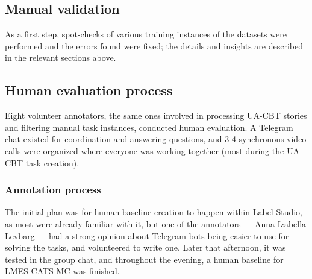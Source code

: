 \subsection{Manual validation}\label{manual-validation}
As a first step, spot-checks of various training instances of the
datasets were performed and the errors found were fixed; the details and insights are described in the relevant sections above.






\subsection{Human evaluation process}
Eight volunteer annotators, the same ones involved in processing UA-CBT stories and filtering manual task instances, conducted human evaluation.
A Telegram chat existed for coordination and answering questions, and 3-4 synchronous video calls were organized where everyone was working together (most during the UA-CBT task creation).

\subsubsection{Annotation process}
The initial plan was for human baseline creation to happen within Label Studio, as most were already familiar with it, but one of the annotators — Anna-Izabella Levbarg — had a strong opinion about Telegram bots being easier to use for solving the tasks, and volunteered to write one. 
Later that afternoon, it was tested in the group chat, and throughout the evening, a human baseline for LMES CATS-MC was finished.

